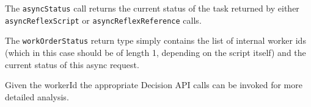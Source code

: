 The \verb+asyncStatus+ call returns the current status of the task returned by either
\verb+asyncReflexScript+ or \verb+asyncReflexReference+ calls.

The \verb+workOrderStatus+ return type simply contains the list of internal worker ids
(which in this case should be of length 1, depending on the \Reflex script itself) and
the current status of this async request.

Given the workerId the appropriate Decision API calls can be invoked for more detailed
analysis.
